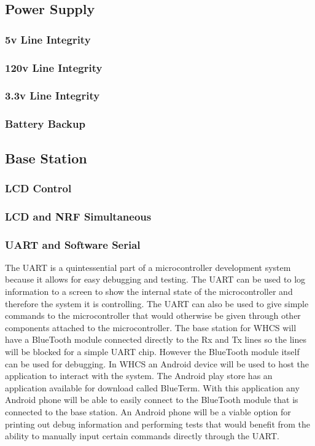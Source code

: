 \tbw

\subsection{Power Supply}

\subsubsection{5v Line Integrity}

\subsubsection{120v Line Integrity}

\subsubsection{3.3v Line Integrity}

\subsubsection{Battery Backup}

\subsection{Base Station}

\subsubsection{LCD Control}

\subsubsection{LCD and NRF Simultaneous}

\subsubsection{UART and Software Serial}

The UART is a quintessential part of a microcontroller development system
because it allows for easy debugging and testing. The UART can be used to log
information to a screen to show the internal state of the microcontroller and
therefore the system it is controlling. The UART can also be used to give
simple commands to the microcontroller that would otherwise be given through
other components attached to the microcontroller. The base station for WHCS
will have a BlueTooth module connected directly to the Rx and Tx lines so the
lines will be blocked for a simple UART chip. However the BlueTooth module
itself can be used for debugging. In WHCS an Android device will be used to
host the application to interact with the system. The Android play store has an
application available for download called BlueTerm. With this application any
Android phone will be able to easily connect to the BlueTooth module that is
connected to the base station. An Android phone will be a viable option for
printing out debug information and performing tests that would benefit from the
ability to manually input certain commands directly through the UART.

